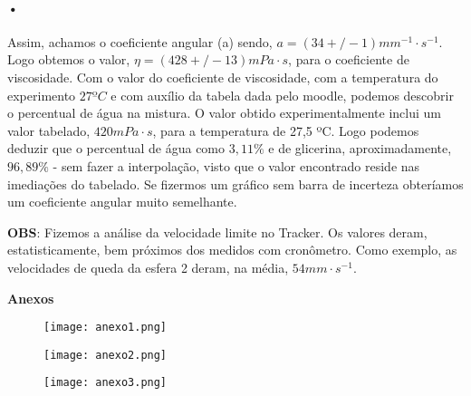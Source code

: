 \documentclass[a4paper, 11pt]{article}
\begin{document}
\begin{enumerate}
\paragraph{•}
Assim, achamos o coeficiente angular (a) sendo, $a = (34 +/- 1) mm^{-1} \cdot s^{-1}$. Logo obtemos o valor, $\eta = (428 +/- 13) mPa \cdot s$, para o coeficiente de viscosidade. 
Com o valor do coeficiente de viscosidade, com a temperatura do experimento $27 ºC$ e com auxílio da tabela dada pelo moodle, podemos descobrir o percentual de água na mistura. O valor obtido experimentalmente inclui um valor tabelado, $420 mPa\cdot s$, para a temperatura de 27,5 ºC. Logo podemos deduzir que o percentual de água como $3,11 \%$ e de glicerina, aproximadamente, $ 96,89\%$ - sem fazer a interpolação, visto que o valor encontrado reside nas imediações do tabelado. Se fizermos um gráfico sem barra de incerteza obteríamos um coeficiente angular muito semelhante.

\textbf{OBS}: Fizemos a análise da velocidade limite no Tracker. Os valores deram, estatisticamente, bem próximos dos medidos com cronômetro. Como exemplo, as velocidades de queda da esfera 2 deram, na média, $54 mm \cdot s^{-1}$.

	
		\end{enumerate}

	
\pagebreak

\textbf{Anexos}

\begin{figure}[!h]
		\centering
		\texttt{[image: anexo1.png]}
		\end{figure}

\begin{figure}[!h]
		\centering
		\texttt{[image: anexo2.png]}
		\end{figure}

\begin{figure}[!h]
		\centering
		\texttt{[image: anexo3.png]}
		\end{figure}


























\end{document}
